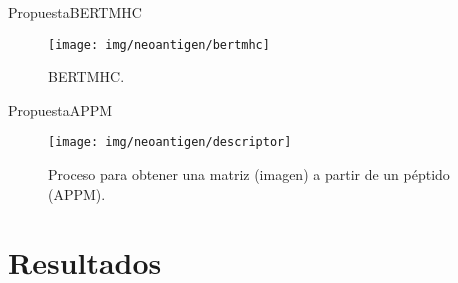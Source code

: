 \documentclass[10pt]{beamer}
\newcommand{\1}{
	\setbeamertemplate{background}{
		\texttt{[image: img/1]}
		\tikz[overlay] \fill[fill opacity=0.75,fill=white] (0,0) rectangle (-\paperwidth,\paperheight);
	}
}
\begin{document}
\begin{frame}{Propuesta}{BERTMHC}	
	\begin{figure}
		\centering
		\texttt{[image: img/neoantigen/bertmhc]}	
		\caption{BERTMHC.}
	\end{figure}
\end{frame}

\begin{frame}{Propuesta}{APPM}	
	\begin{figure}
		\centering
		\texttt{[image: img/neoantigen/descriptor]}	
		\caption{Proceso para obtener una matriz (imagen) a partir de un péptido (APPM).}
		\label{fig:descriptor}
	\end{figure}
\end{frame}

\section{Resultados}
\end{document}
